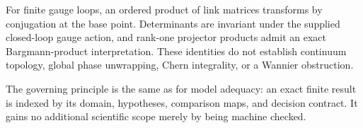 For finite gauge loops, an ordered product of link matrices transforms by conjugation at
the base point.  Determinants are invariant under the supplied closed-loop gauge action,
and rank-one projector products admit an exact Bargmann-product interpretation.  These
identities do not establish continuum topology, global phase unwrapping, Chern
integrality, or a Wannier obstruction.

The governing principle is the same as for model adequacy: an exact finite result is
indexed by its domain, hypotheses, comparison maps, and decision contract.  It gains no
additional scientific scope merely by being machine checked.
